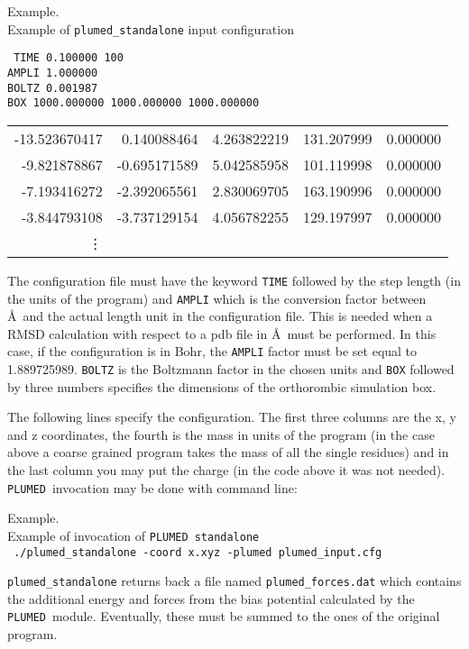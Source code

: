 \documentclass[12pt,fleqn]{report}
\newcommand{\plumed}{{\tt PLUMED}}
\newcommand{\esempio}[1]{
\vspace{10pt}
\begin{flushright}
\colorbox{light-gray}{
   \begin{minipage}{13cm}
       \scriptsize{
{\fontfamily{phv} \fontseries{b}
 \selectfont Example. \\
 \fontseries{m} \selectfont #1 } }
\end{minipage}}
\end{flushright}
\vspace{20pt}
}
\begin{document}
\esempio{Example of {\tt plumed\_standalone}  input configuration  \vspace{10pt} \\
{\tt 
TIME 0.100000 100 \\
AMPLI 1.000000 \\
BOLTZ 0.001987 \\
BOX 1000.000000 1000.000000 1000.000000 \\
 \begin{tabular}{ r r r r r  }
     -13.523670417   &     0.140088464   &     4.263822219  &  131.207999  &   0.000000 \\
      -9.821878867   &    -0.695171589   &     5.042585958  &  101.119998  &   0.000000 \\
      -7.193416272   &    -2.392065561   &     2.830069705  &  163.190996  &   0.000000 \\
      -3.844793108   &    -3.737129154   &     4.056782255  &  129.197997  &   0.000000 \\
       \vdots
 \end{tabular}
} 
}

The configuration file must have the keyword {\tt TIME} followed by the step length (in the units  
of the program) and {\tt AMPLI} which is the conversion factor between \AA\ and the actual length unit in
the configuration file. This is needed when a RMSD calculation with respect to a pdb file in \AA \ must be performed. 
In this case, if the configuration is in Bohr, the {\tt AMPLI} factor must be set equal to 1.889725989.
{\tt BOLTZ} is the Boltzmann factor in the chosen units and {\tt BOX} followed by three numbers specifies the dimensions 
of the orthorombic simulation box.  

The following lines specify the configuration. The first three columns are 
the x, y and z coordinates, the fourth is the mass in units of the program (in the case above a coarse grained program takes the mass of 
all the single residues) and in the last column you may put the charge (in the code above it was not needed). 
\plumed \ invocation may be done with command line:

\esempio{Example of invocation of \plumed\ {\tt standalone}
\vspace{10pt} \\
{\tt
./plumed\_standalone -coord x.xyz -plumed plumed\_input.cfg 
}
}

{\tt plumed\_standalone} returns back a file named {\tt plumed\_forces.dat} which 
contains the additional energy and forces from the bias potential calculated by the 
\plumed \ module. Eventually, these must be summed to the ones of the original program. 
\end{document}
